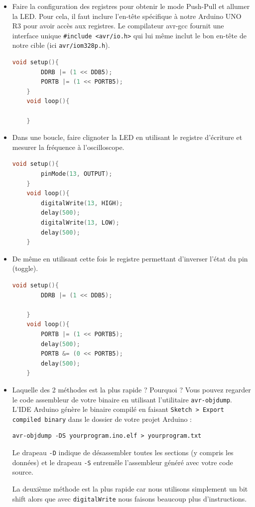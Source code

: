 \documentclass[a4paper,11pt]{article}
\begin{document}
\begin{itemize}
    \item Faire la configuration des registres pour obtenir le mode Push-Pull et allumer la LED. Pour cela, il faut inclure l'en-tête spécifique à notre Arduino UNO R3 pour avoir accès aux registres. Le compilateur avr-gcc fournit une interface unique \texttt{\#include <avr/io.h>} qui lui même inclut le bon en-tête de notre cible (ici \texttt{avr/iom328p.h}).
    \begin{solution}
        \begin{lstlisting}[language=C++]
    void setup(){
        DDRB |= (1 << DDB5);
        PORTB |= (1 << PORTB5);
    }
    void loop(){
        
    }
        \end{lstlisting}
    \end{solution}

    \item Dans une boucle, faire clignoter la LED en utilisant le registre d'écriture et mesurer la fréquence à l'oscilloscope.
    \begin{solution}
        \begin{lstlisting}[language=C++]
   void setup(){
        pinMode(13, OUTPUT);        
    }
    void loop(){
        digitalWrite(13, HIGH);
        delay(500);
        digitalWrite(13, LOW);
        delay(500);
    }
        \end{lstlisting}
    \end{solution}

    \item De même en utilisant cette fois le registre permettant d'inverser l'état du pin (toggle).
    \begin{solution}
            \begin{lstlisting}[language=C++]
   void setup(){
        DDRB |= (1 << DDB5);
        
    }
    void loop(){
        PORTB |= (1 << PORTB5);
        delay(500);
        PORTB &= (0 << PORTB5);
        delay(500);
    }
        \end{lstlisting}
    \end{solution}

    \item Laquelle des 2 méthodes est la plus rapide ? Pourquoi ? Vous pouvez regarder le code assembleur de votre binaire en utilisant l'utilitaire \texttt{avr-objdump}. L'IDE Arduino génère le binaire compilé en faisant \texttt{Sketch > Export compiled binary} dans le dossier de votre projet Arduino :
    \begin{verbatim}
avr-objdump -DS yourprogram.ino.elf > yourprogram.txt
    \end{verbatim}
    Le drapeau \texttt{-D} indique de désassembler toutes les sections (y compris les données) et le drapeau \texttt{-S} entremêle l'assembleur généré avec votre code source.
    \begin{solution}
        La deuxième méthode est la plus rapide car nous utilisons simplement un bit shift alors que avec \texttt{digitalWrite} nous faisons beaucoup plus d'instructions.
    \end{solution}


\end{itemize}
\end{document}
